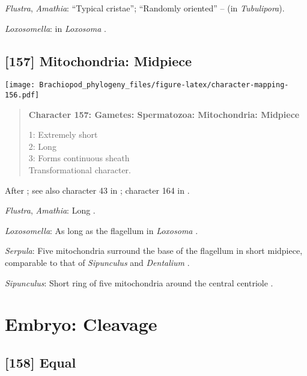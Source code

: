 \documentclass[openany]{book}
\theoremstyle{definition}
\theoremstyle{definition}
\theoremstyle{definition}
\theoremstyle{remark}
\begin{document}
\hypertarget{Amathia-coding-156}{}
\emph{Flustra}, \emph{Amathia}: ``Typical cristae''; ``Randomly
oriented'' -- \citet{Franzen1984} (in \emph{Tubulipora}).

\hypertarget{Loxosomella-coding-156}{}
\emph{Loxosomella}: in \emph{Loxosoma} \citep{Franzen2000}.

\subsection*{{[}157{]} Mitochondria:
Midpiece}\label{mitochondria-midpiece}

\texttt{[image: Brachiopod\_phylogeny\_files/figure-latex/character-mapping-156.pdf]}

\begin{quote}
\textbf{Character 157: Gametes: Spermatozoa: Mitochondria: Midpiece}

1: Extremely short\\
2: Long\\
3: Forms continuous sheath\\
Transformational character.
\end{quote}

After \citet{Smith2012}; see also character 43 in \citet{Ponder1997};
character 164 in \citet{Giribet2002}.

\hypertarget{Amathia-coding-157}{}
\emph{Flustra}, \emph{Amathia}: Long \citep{Franzen1981}.

\hypertarget{Loxosomella-coding-157}{}
\emph{Loxosomella}: As long as the flagellum in \emph{Loxosoma}
\citep{Franzen2000}.

\hypertarget{Serpula-coding-157}{}
\emph{Serpula}: Five mitochondria surround the base of the flagellum in
short midpiece, comparable to that of \emph{Sipunculus} and
\emph{Dentalium} \citep{Gherardi2011}.

\hypertarget{Sipunculus-coding-157}{}
\emph{Sipunculus}: Short ring of five mitochondria around the central
centriole \citep{Rice1993}.

\section{Embryo: Cleavage}\label{embryo-cleavage}

\subsection*{{[}158{]} Equal}\label{equal}
\end{document}
